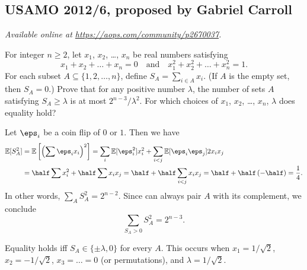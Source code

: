 \documentclass[11pt]{scrartcl}
\begin{document}
\subsection{USAMO 2012/6, proposed by Gabriel Carroll}
\textsl{Available online at \url{https://aops.com/community/p2670037}.}
\begin{mdframed}[style=mdpurplebox,frametitle={Problem statement}]
For integer $n \ge 2$,
let $x_1$, $x_2$, \dots, $x_n$ be real numbers satisfying
\[ x_1 + x_2 +  \dots + x_n = 0
  \quad\text{and}\quad x_1^2 + x_2^2 + \dots + x_n^2 = 1. \]
For each subset $A\subseteq\{1, 2, \dots, n\}$, define $S_A=\sum_{i\in A} x_i$.
(If $A$ is the empty set, then $S_A=0$.)
Prove that for any positive number $\lambda$,
the number of sets $A$ satisfying $S_A\geq\lambda$ is at most $2^{n-3}/\lambda^2$.
For which choices of $x_1$, $x_2$, \dots, $x_n$, $\lambda$ does equality hold?
\end{mdframed}
Let $\eps_i$ be a coin flip of $0$ or $1$.
Then we have
\begin{align*} \mathbb E[S_A^2]
  &= \mathbb E\left[ \left( \sum \eps_i x_i \right)^2 \right]
  = \sum_i \mathbb E[\eps_i^2] x_i^2
  + \sum_{i < j} \mathbb E[\eps_i\eps_j] 2x_i x_j \\
  &= \half \sum x_i^2 + \half \sum x_i x_j
  = \half + \half \sum_{i<j} x_i x_j
  = \half + \half \left( -\half \right) = \frac 14.
\end{align*}
In other words, $\sum_A S_A^2 = 2^{n-2}$.
Since can always pair $A$ with its complement, we conclude
\[ \sum_{S_A > 0} S_A^2 = 2^{n-3}. \]

Equality holds iff $S_A \in \{\pm \lambda, 0\}$ for every $A$.
This occurs when $x_1 = 1/\sqrt2$, $x_2 = -1/\sqrt2$,
$x_3 = \dots = 0$ (or permutations), and $\lambda = 1/\sqrt2$.
\pagebreak
\end{document}
